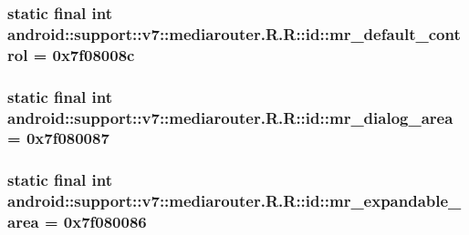 \hypertarget{classandroid_1_1support_1_1v7_1_1mediarouter_1_1_r_1_1id_587cb2c36d0de520cec9c81d5fc5e7e3}{
\subsubsection[{mr\_\-default\_\-control}]{\setlength{\rightskip}{0pt plus 5cm}static final int android::support::v7::mediarouter.R.R::id::mr\_\-default\_\-control = 0x7f08008c}}
\label{classandroid_1_1support_1_1v7_1_1mediarouter_1_1_r_1_1id_587cb2c36d0de520cec9c81d5fc5e7e3}


\hypertarget{classandroid_1_1support_1_1v7_1_1mediarouter_1_1_r_1_1id_b232d9bdd46d3c357b5a688eef0dff5f}{
\subsubsection[{mr\_\-dialog\_\-area}]{\setlength{\rightskip}{0pt plus 5cm}static final int android::support::v7::mediarouter.R.R::id::mr\_\-dialog\_\-area = 0x7f080087}}
\label{classandroid_1_1support_1_1v7_1_1mediarouter_1_1_r_1_1id_b232d9bdd46d3c357b5a688eef0dff5f}


\hypertarget{classandroid_1_1support_1_1v7_1_1mediarouter_1_1_r_1_1id_24b5a0ddbc252ff99d777e557da02c0f}{
\subsubsection[{mr\_\-expandable\_\-area}]{\setlength{\rightskip}{0pt plus 5cm}static final int android::support::v7::mediarouter.R.R::id::mr\_\-expandable\_\-area = 0x7f080086}}
\label{classandroid_1_1support_1_1v7_1_1mediarouter_1_1_r_1_1id_24b5a0ddbc252ff99d777e557da02c0f}


